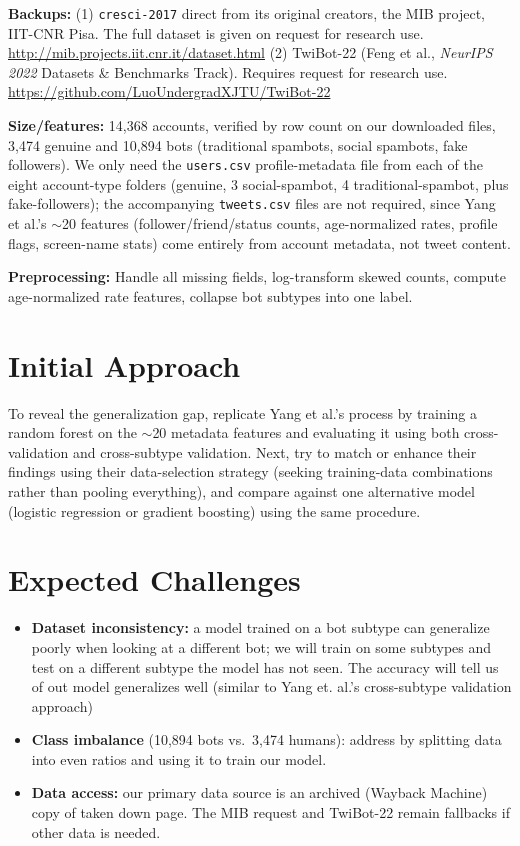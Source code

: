 \documentclass[11pt]{article}
\begin{document}
\textbf{Backups:} (1) \texttt{cresci-2017} direct from its original creators, the MIB project, IIT-CNR Pisa. The full dataset is given on request for research use. \url{http://mib.projects.iit.cnr.it/dataset.html} \quad (2) TwiBot-22 (Feng et al., \emph{NeurIPS 2022} Datasets \& Benchmarks Track). Requires request for research use. \url{https://github.com/LuoUndergradXJTU/TwiBot-22}

\textbf{Size/features:} 14{,}368 accounts, verified by row count on our downloaded files, 3{,}474 genuine and 10{,}894 bots (traditional spambots, social spambots, fake followers). We only need the \texttt{users.csv} profile-metadata file from each of the eight account-type folders (genuine, 3 social-spambot, 4 traditional-spambot, plus fake-followers); the accompanying \texttt{tweets.csv} files are not required, since Yang et al.'s $\sim$20 features (follower/friend/status counts, age-normalized rates, profile flags, screen-name stats) come entirely from account metadata, not tweet content.
 
\textbf{Preprocessing:} Handle all missing fields, log-transform skewed counts, compute age-normalized rate features, collapse bot subtypes into one label. 

\section{Initial Approach}

To reveal the generalization gap, replicate Yang et al.'s process by training a random forest on the $\sim$20 metadata features and evaluating it using both cross-validation and cross-subtype validation. Next, try to match or enhance their findings using their data-selection strategy (seeking training-data combinations rather than pooling everything), and compare against one alternative model (logistic regression or gradient boosting) using the same procedure.

\section{Expected Challenges}
 
\begin{itemize}
    \item \textbf{Dataset inconsistency:} a model trained on a bot subtype can generalize poorly when looking at a different bot; we will train on some subtypes and test on a different subtype the model has not seen. The accuracy will tell us of out model generalizes well (similar to Yang et. al.'s cross-subtype validation approach)
    \item \textbf{Class imbalance} (10{,}894 bots vs.\ 3{,}474 humans): address by splitting data into even ratios and using it to train our model.
    \item \textbf{Data access:} our primary data source is an archived (Wayback Machine) copy of taken down page. The MIB request and TwiBot-22 remain fallbacks if other data is needed.
\end{itemize}
\end{document}
